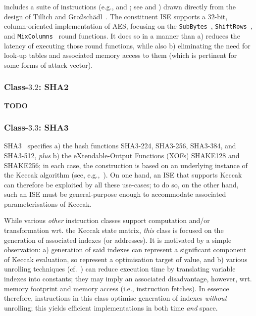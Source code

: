 \XCRYPTO includes a suite of instructions 
(e.g.,  and ; see  and )
drawn directly from the design of
Tillich and Gro{\ss}sch\"{a}dl~\cite{SCARV:TilGro:06}.
The constituent ISE supports a $32$-bit, column-oriented implementation 
of AES, focusing on the
{\tt SubBytes}~\cite[Section 5.1.1]{SCARV:FIPS:197},
{\tt ShiftRows}~\cite[Section 5.1.2]{SCARV:FIPS:197}, 
and
{\tt MixColumns}~\cite[Section 5.1.3]{SCARV:FIPS:197}
round functions.  It does so in a manner than 
a) reduces the latency of executing those round functions, 
   while also
b) eliminating the need for look-up tables and associated memory access
   to them (which is pertinent for some forms of attack vector).


\subsubsection{Class-$3.2$: SHA2}
\label{sec:bg:feature:3:2}

{\bf TODO}


\subsubsection{Class-$3.3$: SHA3}
\label{sec:bg:feature:3:3}

SHA3~\cite{SCARV:FIPS:202}
specifies 
a) the hash functions SHA3-224, SHA3-256, SHA3-384, and SHA3-512,
   {\em plus}
b) the eXtendable-Output Functions (XOFs) SHAKE128 and SHAKE256;
in each case, the construction is based on an underlying instance of the
Keccak algorithm (see, e.g.,~\cite{SCARV:BDPA:13}).  On one hand, an ISE
that supports Keccak can therefore be exploited by all these use-cases;
to do so, on the other hand, such an ISE must be general-purpose enough
to accommodate associated parameterisations of Keccak.

While various {\em other} \XCRYPTO instruction classes support computation
and/or transformation wrt. the Keccak state matrix, {\em this} class is
focused on the generation of associated indexes (or addresses).  It is
motivated by a simple observation:
a) generation of said indexes can represent a significant component of
   Keccak evaluation, so represent a optimisation target of value,
   and
b) various unrolling techniques (cf.~\cite{SCARV:BDPAK:12}) can reduce 
   execution time by translating variable indexes into constants; they
   may imply an associated disadvantage, however, wrt. memory footprint
   and memory access (i.e., instruction fetches).
In essence therefore, instructions in this class optimise generation of
indexes {\em without} unrolling; this yields efficient implementations
in both time {\em and} space.

